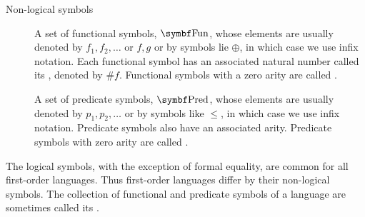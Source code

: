 \begin{definition}
\begin{description}
    \item[Non-logical symbols]\mbox{}
    \begin{DefEnum}[resume=def:first_order_language]
       A set of functional symbols, \( \Bold{Fun} \), whose elements are usually denoted by \( f_1, f_2, \ldots \) or \( f, g \) or by symbols lie \( \oplus \), in which case we use infix notation. Each functional symbol has an associated natural number called its , denoted by \( \# f \). Functional symbols with a zero arity are called .

       A set of predicate symbols, \( \Bold{Pred} \), whose elements are usually denoted by \( p_1, p_2, \ldots \) or by symbols like \( \leq \), in which case we use infix notation. Predicate symbols also have an associated arity. Predicate symbols with zero arity are called .
    \end{DefEnum}
  \end{description}

  The logical symbols, with the exception of formal equality, are common for all first-order languages. Thus first-order languages differ by their non-logical symbols. The collection of functional and predicate symbols of a language are sometimes called its .
\end{definition}

